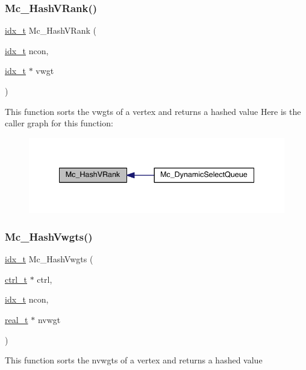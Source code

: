\subsubsection{\texorpdfstring{Mc\+\_\+\+Hash\+V\+Rank()}{Mc\_HashVRank()}}
{\footnotesize\ttfamily \hyperlink{a00876_aaa5262be3e700770163401acb0150f52}{idx\+\_\+t} Mc\+\_\+\+Hash\+V\+Rank (\begin{DoxyParamCaption}\item[{\hyperlink{a00876_aaa5262be3e700770163401acb0150f52}{idx\+\_\+t}}]{ncon,  }\item[{\hyperlink{a00876_aaa5262be3e700770163401acb0150f52}{idx\+\_\+t} $\ast$}]{vwgt }\end{DoxyParamCaption})}

This function sorts the vwgts of a vertex and returns a hashed value Here is the caller graph for this function\+:\nopagebreak
\begin{figure}[H]
\begin{center}
\leavevmode
\includegraphics[width=338pt]{a00404_a626dd91f1c7a272128a4e825fa72cf18_icgraph}
\end{center}
\end{figure}
\mbox{\label{a00404_ab26a17f837c7eb837a18fc921021e586}} 
\subsubsection{\texorpdfstring{Mc\+\_\+\+Hash\+Vwgts()}{Mc\_HashVwgts()}}
{\footnotesize\ttfamily \hyperlink{a00876_aaa5262be3e700770163401acb0150f52}{idx\+\_\+t} Mc\+\_\+\+Hash\+Vwgts (\begin{DoxyParamCaption}\item[{\hyperlink{a00742}{ctrl\+\_\+t} $\ast$}]{ctrl,  }\item[{\hyperlink{a00876_aaa5262be3e700770163401acb0150f52}{idx\+\_\+t}}]{ncon,  }\item[{\hyperlink{a00876_a1924a4f6907cc3833213aba1f07fcbe9}{real\+\_\+t} $\ast$}]{nvwgt }\end{DoxyParamCaption})}

This function sorts the nvwgts of a vertex and returns a hashed value 